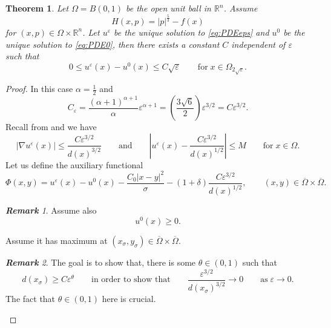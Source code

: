 \documentclass[11pt,reqno]{amsart}
\numberwithin{figure}{section}
\theoremstyle{plain}
\newtheorem{thm}{Theorem}[section]
\theoremstyle{remark}
\newtheorem{rem}{\bf{Remark}}
\numberwithin{equation}{section}
\begin{document}
\begin{thm}\label{thm:rate_doubling1} Let $\Omega = B(0,1)$ be the open unit ball in $\mathbb{R}^n$. Assume
\begin{equation*}
    H(x,p) = |p|^{\frac{5}{3}} - f(x)
\end{equation*}
for $(x,p)\in \Omega\times\mathbb{R}^n$. Let $u^\varepsilon$ be the unique solution to \eqref{eq:PDEeps} and $u^0$ be the unique solution to \eqref{eq:PDE0}, then there exists a constant $C$ independent of $\varepsilon$ such that
\begin{equation*}
    0\leq u^\varepsilon(x) - u^0(x) \leq C\sqrt{\varepsilon} \qquad\text{for}\;x\in \Omega_{2\sqrt{\varepsilon}}.
\end{equation*}
\end{thm}
\begin{proof} In this case $\alpha = \frac{1}{2}$ and 
\begin{equation*}
    C_\varepsilon = \frac{(\alpha+1)^{\alpha+1}}{\alpha}\varepsilon^{\alpha+1} = \left(\frac{3\sqrt{6}}{2}\right)\varepsilon^{3/2} = C\varepsilon^{3/2}.
\end{equation*}
Recall from \cite{alessio_asymptotic_2006} and \cite{Lasry1989} we have
\begin{equation*}
|\nabla u^\varepsilon(x)|  \leq \frac{C\varepsilon^{3/2}}{d(x)^{3/2}} \qquad\text{and}\qquad \left|u^\varepsilon(x) - \frac{C\varepsilon^{3/2}}{d(x)^{1/2}}\right|\leq M\qquad\text{for}\;x\in \Omega.
\end{equation*}
Let us define the auxiliary functional
\begin{equation*}
    \Phi(x,y) = u^\varepsilon(x) - u^0(x) -\frac{C_0|x-y|^2}{\sigma} - \left(1+\delta\right) \frac{C\varepsilon^{3/2}}{d(x)^{1/2}}, \qquad (x,y)\in \overline{\Omega}\times \overline{\Omega}.
\end{equation*}
\begin{rem} Assume also
\begin{equation*}
    u^0(x) \geq 0.
\end{equation*}
\end{rem}
\noindent
Assume it has maximum at $(x_\sigma,y_\sigma)\in \overline{\Omega}\times \overline{\Omega}$. 

\begin{rem} \color{blue} The goal is to show that, there is some $\theta\in (0,1)$ such that
\begin{equation*}
    d(x_\sigma)\geq C\varepsilon^\theta \qquad\text{in order to show that}\qquad \frac{\varepsilon^{3/2}}{d(x_\sigma)^{3/2}} \rightarrow 0 \qquad\text{as}\;\varepsilon\to 0.
\end{equation*}
The fact that $\theta \in (0,1)$ here is crucial.
\color{black}
\end{rem}
\noindent 


\end{proof}
\end{document}
